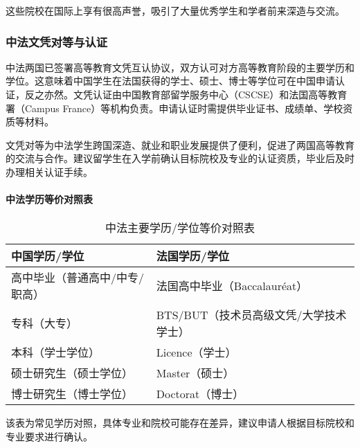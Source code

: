 这些院校在国际上享有很高声誉，吸引了大量优秀学生和学者前来深造与交流。

\subsubsection{中法文凭对等与认证}

中法两国已签署高等教育文凭互认协议，双方认可对方高等教育阶段的主要学历和学位。这意味着中国学生在法国获得的学士、硕士、博士等学位可在中国申请认证，反之亦然。文凭认证由中国教育部留学服务中心（CSCSE）和法国高等教育署（Campus France）等机构负责。申请认证时需提供毕业证书、成绩单、学校资质等材料。

文凭对等为中法学生跨国深造、就业和职业发展提供了便利，促进了两国高等教育的交流与合作。建议留学生在入学前确认目标院校及专业的认证资质，毕业后及时办理相关认证手续。

\paragraph{中法学历等价对照表}

\begin{table}[h!]
\centering
\begin{tabular}{|l|l|}
\hline
\textbf{中国学历/学位} & \textbf{法国学历/学位} \\
\hline
高中毕业（普通高中/中专/职高） & 法国高中毕业（Baccalauréat） \\
\hline
专科（大专） & BTS/BUT（技术员高级文凭/大学技术学士） \\
\hline
本科（学士学位） & Licence（学士） \\
\hline
硕士研究生（硕士学位） & Master（硕士） \\
\hline
博士研究生（博士学位） & Doctorat（博士） \\
\hline
\end{tabular}
\caption{中法主要学历/学位等价对照表}
\end{table}

该表为常见学历对照，具体专业和院校可能存在差异，建议申请人根据目标院校和专业要求进行确认。
